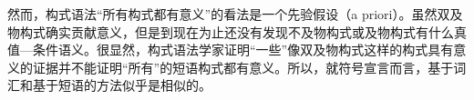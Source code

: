 然而，构式语法“所有构式都有意义”的看法是一个先验假设（a priori）。虽然双及物构式确实贡献意义，但是到现在为止还没有发现不及物构式或及物构式有什么真值—条件语义。很显然，构式语法学家证明“一些”像双及物构式这样的构式具有意义的证据并不能证明“所有”的短语构式都有意义。所以，就符号宣言而言，基于词汇和基于短语的方法似乎是相似的。
